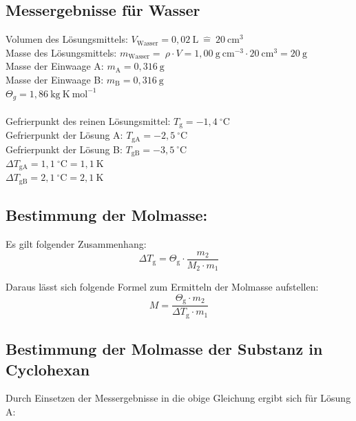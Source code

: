 \documentclass[12pt,a4paper,titlepage,headinclude,bibtotoc]{scrartcl}
\begin{document}
\subsection{Messergebnisse für Wasser}

Volumen des Lösungsmittels: $V_{\mathrm{Wasser}} = 0,02 {~} \mathrm{L}{~}\widehat{=}{~}20 {~}\mathrm{cm^3}$ \\
Masse des Lösungsmittels:  $m_{\mathrm{Wasser}} = {~} \rho \cdot V = 1,00{~} \mathrm{g {~}cm^{-3}} \cdot 20{~} \mathrm{cm^{3}} = 20{~}\mathrm{g}$\\
Masse der Einwaage A: $m_\mathrm{A} = 0,316{~} \mathrm{g}$\\ 
Masse der Einwaage B: $m_\mathrm{B} = 0,316{~} \mathrm{g}$\\
$\mathit{\Theta} _g = 1,86 {~}\mathrm{kg{~}K {~} mol^{-1}}$\\\\
Gefrierpunkt des reinen Lösungsmittel: $ T_\mathrm{g} = -1,4 {~}^{\circ}\text{C}$\\
Gefrierpunkt der Lösung A: $ T_\mathrm{gA} = -2,5 {~}^{\circ}\text{C}$\\
Gefrierpunkt der Lösung B: $ T_\mathrm{gB} = -3,5 {~}^{\circ}\text{C}$\\
$ \Delta T _\mathrm{gA} =  1,1 {~}^{\circ}\text{C} = 1,1 {~}\mathrm{K} $\\
$ \Delta T _\mathrm{gB} = 2,1 {~}^{\circ}\text{C} = 2,1{~} \mathrm{K} $

\subsection{Bestimmung der Molmasse:}

Es gilt folgender Zusammenhang:
\begin{equation}
\Delta T_\mathrm{g} = \mathit{\Theta} _\mathrm{g} \cdot \frac{m_2}{M_2 \cdot m_1}
\end{equation}

Daraus lässt sich folgende Formel zum Ermitteln der Molmasse aufstellen:
\begin{equation}
 M = \frac{\mathit{\Theta} _\mathrm{g} \cdot m_2 }{ \Delta T_\mathrm{g}\cdot m_1}
\end{equation}

\subsection{ Bestimmung der Molmasse der Substanz in Cyclohexan}

Durch Einsetzen der Messergebnisse in die obige Gleichung ergibt sich für Lösung A:\\
\end{document}
